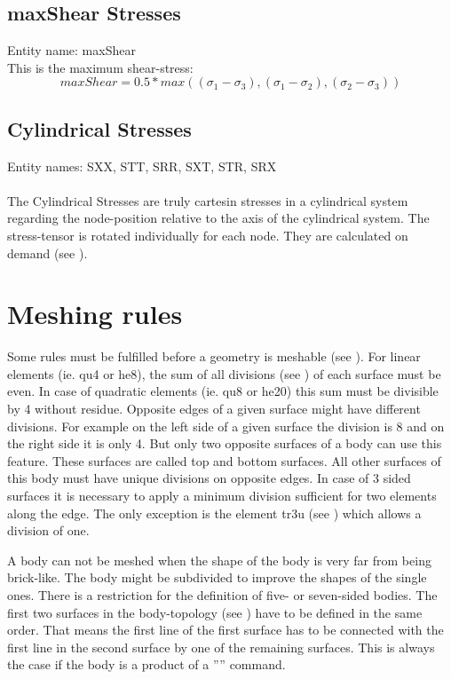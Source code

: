 \documentclass{article}
\begin{document}
\subsection{\label{maxShear Stress}maxShear Stresses}
Entity name: maxShear\\
This is the maximum shear-stress:
\[ maxShear = 0.5 * max( (\sigma_{1} - \sigma_{3}),(\sigma_{1} - \sigma_{2}),(\sigma_{2} - \sigma_{3}) )\]

\subsection{\label{Cylindrical Stresses}Cylindrical Stresses}
Entity names: SXX, STT, SRR, SXT, STR, SRX\\\\
The Cylindrical Stresses are truly cartesin stresses in a cylindrical system regarding the node-position relative to the axis of the cylindrical system. The stress-tensor is rotated individually for each node. They are calculated on demand (see ).

 \section{\label{Meshing rules}Meshing rules}
Some rules must be fulfilled before a geometry is meshable (see ). For linear elements (ie. qu4 or he8), the sum of all divisions (see ) of each surface must be even. In case of quadratic elements (ie. qu8 or he20) this sum must be divisible by 4 without residue. Opposite edges of a given surface might have different divisions. For example on the left side of a given surface the division is 8 and on the right side it is only 4. But only two opposite surfaces of a body can use this feature. These surfaces are called top and bottom surfaces. All other surfaces of this body must have unique divisions on opposite edges. In case of 3 sided surfaces it is necessary to apply a minimum division sufficient for two elements along the edge. The only exception is the element tr3u (see ) which allows a division of one.

A body can not be meshed when the shape of the body is very far from being brick-like. The body might be subdivided to improve the shapes of the single ones. There is a restriction for the definition of five- or seven-sided bodies. The first two surfaces in the body-topology (see ) have to be defined in the same order. That means the first line of the first surface has to be connected with the first line in the second surface by one of the remaining surfaces. This is always the case if the body is a product of a '''' command.
\end{document}
